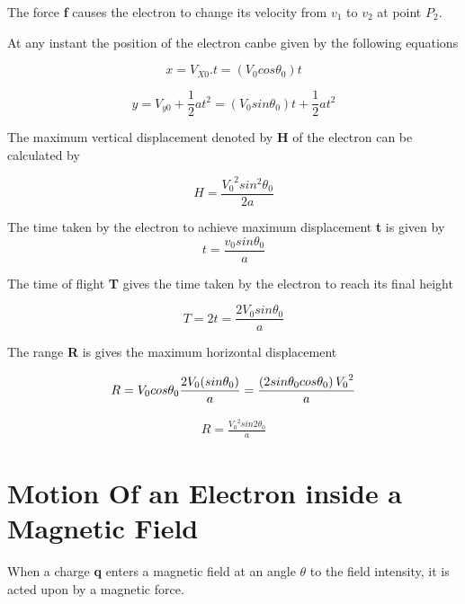 \documentclass[a4paper,20pt,twoside]{report}
\begin{document}
	The force \textbf{f} causes the electron to change its velocity from $v_1$ to $v_2$ at point $P_2$.
	
	At any instant the position of the electron canbe given by the following equations 
	
	\begin{equation}
	x = V_{X0} . t = \left(V_0cos\theta_0\right)t
	\end{equation}
	
	\begin{equation}
	y  =  V_{y0}  + \frac{1}{2}at^2 = (V_0 sin\theta_0)t + \frac{1}{2}at^2
	\end{equation}
	
	
	The maximum vertical displacement denoted by \textbf{H} of the electron can be calculated by 
	
	\begin{equation}
	H = \frac{{V_0}^2sin^2\theta_0}{2a}
	\end{equation}
	
	The time taken by the electron to achieve maximum displacement \textbf{t}
	is given by
	\begin{equation}
	t = \frac{v_0sin\theta_0}{a}
	\end{equation}
	
	The time of flight \textbf{T} gives the time taken by the electron
	to reach its final height
	
	\begin{equation}
	T = 2t = \frac{2V_0sin\theta_0}{a}
	\end{equation}
	
	
	The range \textbf{R} is gives the maximum horizontal displacement 
	
	\begin{equation}
	R = V_0 cos \theta_0\frac{2V_0(sin\theta_0)}{a}\\
	= \frac{\left(2sin\theta_0cos\theta_0\right){V_0}^2}{a}
	\end{equation}
	
	\begin{eqnarray}
	R = \frac{{V_0}^2 sin2\theta_0}{a}
	\end{eqnarray}
	
	\section{Motion Of an Electron inside a Magnetic Field}
	
	When a charge \textbf{q} enters a magnetic field at an angle \textbf{$\theta$} to the field intensity,
	it is acted upon by a magnetic force.
	
\end{document}
